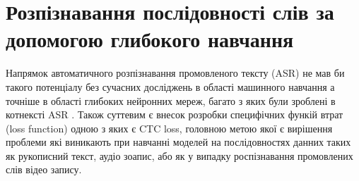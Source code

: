 \section{Розпізнавання послідовності слів за допомогою глибокого навчання}

Напрямок автоматичного розпізнавання промовленого тексту (ASR) не мав би такого потенціалу без сучасних досліджень
в області машинного навчання а точніше в області глибоких нейронних мереж, багато з яких були зроблені в котнексті ASR
\cite{graves2006connectionist,dahl2012context,hinton2012deep}.
Також суттевим є внесок розробки специфічних функій втрат (loss function) одною з яких є CTC loss, головною метою якої
є вирішення проблеми які виникають при навчанні моделей на послідовностях данних таких як рукописний текст, 
аудіо зоапис, або як у випадку роспізнавання промовлених слів відео запису.



\begin{comment}

LipNet is the first end-to-end model that performs sentence-level sequence prediction for visual speech recogntion. That is, we 
demonstrate the first work that takes as input as sequence of images and outputs a distribution over sequences of tokens; it is 
trained end-to-end using CTC and thus also does not require alignments.
\end{comment}